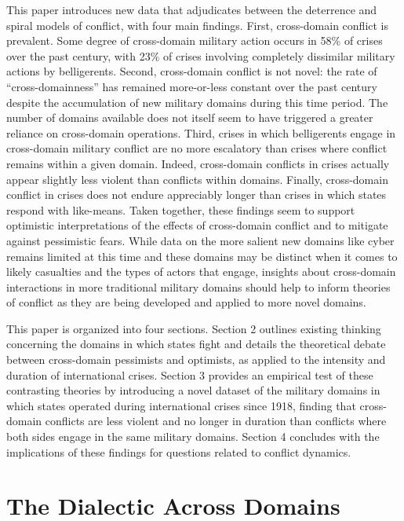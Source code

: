 \documentclass[
]{article}
\begin{document}
This paper introduces new data that adjudicates between the deterrence and spiral models of conflict, with four main findings. First, cross-domain conflict is prevalent. Some degree of cross-domain military action occurs in 58\% of crises over the past century, with 23\% of crises involving completely dissimilar military actions by belligerents. Second, cross-domain conflict is not novel: the rate of ``cross-domainness'' has remained more-or-less constant over the past century despite the accumulation of new military domains during this time period. The number of domains available does not itself seem to have triggered a greater reliance on cross-domain operations. Third, crises in which belligerents engage in cross-domain military conflict are no more escalatory than crises where conflict remains within a given domain. Indeed, cross-domain conflicts in crises actually appear slightly less violent than conflicts within domains. Finally, cross-domain conflict in crises does not endure appreciably longer than crises in which states respond with like-means. Taken together, these findings seem to support optimistic interpretations of the effects of cross-domain conflict and to mitigate against pessimistic fears. While data on the more salient new domains like cyber remains limited at this time and these domains may be distinct when it comes to likely casualties and the types of actors that engage, insights about cross-domain interactions in more traditional military domains should help to inform theories of conflict as they are being developed and applied to more novel domains.

This paper is organized into four sections. Section 2 outlines existing thinking concerning the domains in which states fight and details the theoretical debate between cross-domain pessimists and optimists, as applied to the intensity and duration of international crises. Section 3 provides an empirical test of these contrasting theories by introducing a novel dataset of the military domains in which states operated during international crises since 1918, finding that cross-domain conflicts are less violent and no longer in duration than conflicts where both sides engage in the same military domains. Section 4 concludes with the implications of these findings for questions related to conflict dynamics.

\hypertarget{the-dialectic-across-domains}{%
\section{The Dialectic Across Domains}\label{the-dialectic-across-domains}}
\end{document}
